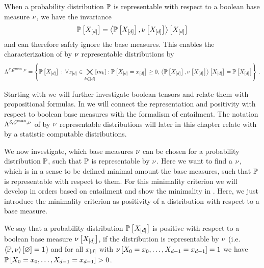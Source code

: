 When a probability distribution $\mathbb{P}$ is representable with respect to a boolean base measure $\nu$, we have the invariance
\begin{align*}
    \mathbb{P}\left[X_{[d]}\right]=\left\langle \mathbb{P}\left[X_{[d]}\right],\nu\left[X_{[d]}\right]\right\rangle \left[ X_{[d]} \right]
\end{align*}
and can therefore safely ignore the base measures.
This enables the characterization of by $\nu$ representable distributions by
\begin{align*}
    \Lambda^{\delta,\mathcal{G}^{\mathrm{max}},\nu}
    = \left\{ \mathbb{P}\left[X_{[d]}\right] \,:\,\forall{x_{[d]}\in\bigtimes_{k\in[d]}[m_{k}]}:{\mathbb{P}\left[X_{[d]}=x_{[d]}\right]\geq0}, \, \left\langle \mathbb{P}\left[X_{[d]}\right],\nu\left[X_{[d]}\right]\right\rangle \left[ X_{[d]} \right]
    = \mathbb{P}\left[X_{[d]}\right] \right\} \, .
\end{align*}

Starting with  we will further investigate boolean tensors and relate them with propositional formulas.
In  we will connect the representation and positivity with respect to boolean base measures with the formalism of entailment.
The notation $\Lambda^{\delta,\mathcal{G}^{\mathrm{max}},\nu}$ of by $\nu$ representable distributions will later in this chapter relate with by a statistic computable distributions. %

We now investigate, which base measures $\nu$ can be chosen for a probability distribution $\mathbb{P}$, such that $\mathbb{P}$ is representable by $\nu$.
Here we want to find a $\nu$, which is in a sense to be defined minimal amount the base measures, such that $\mathbb{P}$ is representable with respect to them.
For this minimality criterion we will develop in  orders based on entailment and show the minimality in .
Here, we just introduce the minimality criterion as positivity of a distribution with respect to a base measure.

\begin{definition}
    \label{def:positivityBaseMeasure}
    We say that a probability distribution $\mathbb{P}\left[X_{[d]}\right]$ is positive with respect to a boolean base measure $\nu\left[X_{[d]}\right]$, if the distribution is representable by $\nu$ (i.e. $\left\langle \mathbb{P},\nu\right\rangle \left[ \varnothing \right]=1$) and for all $x_{[d]}$ with $\nu\left[X_{0}=x_{0},\ldots,X_{d-1}=x_{d-1}\right]=1$ we have $\mathbb{P}\left[X_{0}=x_{0},\ldots,X_{d-1}=x_{d-1}\right]>0$.
\end{definition}

